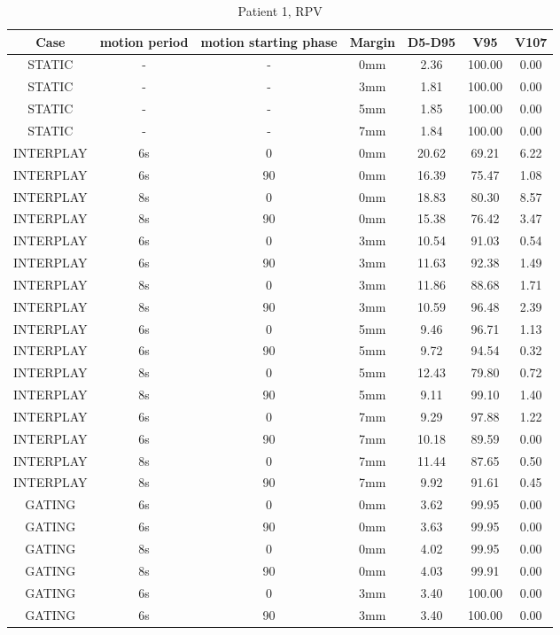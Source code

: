 \begin{table}[H]
  \centering
  \caption{Patient 1, RPV}
  \begin{tabular}{|c||c|c|c||c|c|c|}
    \hline\hline
    Case & motion period & motion starting phase & Margin & D5-D95 & V95 & V107\\
    \hline 
STATIC & - & - & 0mm & 2.36 & 100.00 & 0.00 \\
STATIC & - & - & 3mm & 1.81 & 100.00 & 0.00 \\
STATIC & - & - & 5mm & 1.85 & 100.00 & 0.00 \\
STATIC & - & - & 7mm & 1.84 & 100.00 & 0.00 \\
INTERPLAY & 6s & 0 & 0mm & 20.62 & 69.21 & 6.22 \\
INTERPLAY & 6s & 90 & 0mm & 16.39 & 75.47 & 1.08 \\
INTERPLAY & 8s & 0 & 0mm & 18.83 & 80.30 & 8.57 \\
INTERPLAY & 8s & 90 & 0mm & 15.38 & 76.42 & 3.47 \\
INTERPLAY & 6s & 0 & 3mm & 10.54 & 91.03 & 0.54 \\
INTERPLAY & 6s & 90 & 3mm & 11.63 & 92.38 & 1.49 \\
INTERPLAY & 8s & 0 & 3mm & 11.86 & 88.68 & 1.71 \\
INTERPLAY & 8s & 90 & 3mm & 10.59 & 96.48 & 2.39 \\
INTERPLAY & 6s & 0 & 5mm & 9.46 & 96.71 & 1.13 \\
INTERPLAY & 6s & 90 & 5mm & 9.72 & 94.54 & 0.32 \\
INTERPLAY & 8s & 0 & 5mm & 12.43 & 79.80 & 0.72 \\
INTERPLAY & 8s & 90 & 5mm & 9.11 & 99.10 & 1.40 \\
INTERPLAY & 6s & 0 & 7mm & 9.29 & 97.88 & 1.22 \\
INTERPLAY & 6s & 90 & 7mm & 10.18 & 89.59 & 0.00 \\
INTERPLAY & 8s & 0 & 7mm & 11.44 & 87.65 & 0.50 \\
INTERPLAY & 8s & 90 & 7mm & 9.92 & 91.61 & 0.45 \\
GATING & 6s & 0 & 0mm & 3.62 & 99.95 & 0.00 \\
GATING & 6s & 90 & 0mm & 3.63 & 99.95 & 0.00 \\
GATING & 8s & 0 & 0mm & 4.02 & 99.95 & 0.00 \\
GATING & 8s & 90 & 0mm & 4.03 & 99.91 & 0.00 \\
GATING & 6s & 0 & 3mm & 3.40 & 100.00 & 0.00 \\
GATING & 6s & 90 & 3mm & 3.40 & 100.00 & 0.00 \\

\end{tabular}
\end{table}
